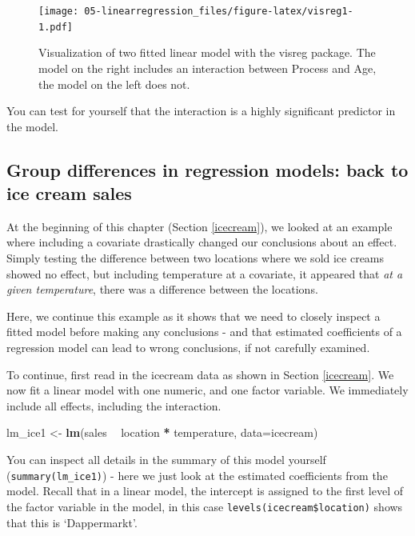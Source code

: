 \documentclass[]{book}
\newenvironment{Shaded}{\begin{snugshade}}{\end{snugshade}}
\newcommand{\DataTypeTok}[1]{\textcolor[rgb]{0.13,0.29,0.53}{#1}}
\newcommand{\KeywordTok}[1]{\textcolor[rgb]{0.13,0.29,0.53}{\textbf{#1}}}
\newcommand{\NormalTok}[1]{#1}
\newcommand{\OperatorTok}[1]{\textcolor[rgb]{0.81,0.36,0.00}{\textbf{#1}}}
\newcommand{\StringTok}[1]{\textcolor[rgb]{0.31,0.60,0.02}{#1}}
\begin{document}
\begin{figure}
\centering
\texttt{[image: 05-linearregression\_files/figure-latex/visreg1-1.pdf]}
\caption{\label{fig:visreg1}Visualization of two fitted linear model with the visreg package. The model on the right includes an interaction between Process and Age, the model on the left does not.}
\end{figure}

You can test for yourself that the interaction is a highly significant predictor in the model.

\hypertarget{icecreamtest}{%
\subsection{Group differences in regression models: back to ice cream sales}\label{icecreamtest}}

At the beginning of this chapter (Section \ref{icecream}), we looked at an example where including a covariate drastically changed our conclusions about an effect. Simply testing the difference between two locations where we sold ice creams showed no effect, but including temperature at a covariate, it appeared that \emph{at a given temperature}, there was a difference between the locations.

Here, we continue this example as it shows that we need to closely inspect a fitted model before making any conclusions - and that estimated coefficients of a regression model can lead to wrong conclusions, if not carefully examined.

To continue, first read in the icecream data as shown in Section \ref{icecream}.
We now fit a linear model with one numeric, and one factor variable. We immediately include all effects, including the interaction.

\begin{Shaded}
\begin{Highlighting}[]
\NormalTok{lm_ice1 <-}\StringTok{ }\KeywordTok{lm}\NormalTok{(sales }\OperatorTok{~}\StringTok{ }\NormalTok{location }\OperatorTok{*}\StringTok{ }\NormalTok{temperature, }\DataTypeTok{data=}\NormalTok{icecream)}
\end{Highlighting}
\end{Shaded}

You can inspect all details in the summary of this model yourself (\texttt{summary(lm\_ice1)}) - here we just look at the estimated coefficients from the model. Recall that in a linear model, the intercept is assigned to the first level of the factor variable in the model, in this case \texttt{levels(icecream\$location)} shows that this is `Dappermarkt'.
\end{document}

